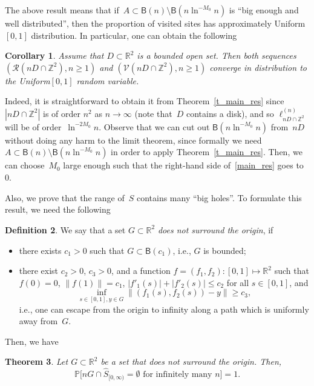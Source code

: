 \documentclass[11pt]{article}
\newtheorem{theo}{Theorem}[section]
\newtheorem{coro}[theo]{Corollary}
\theoremstyle{definition}
\newtheorem{defi}[theo]{Definition}
\numberwithin{equation}{section}
\numberwithin{figure}{section}
\numberwithin{table}{section}
\newcommand{\1}[1]{{\mathbf 1}{\{#1\}}}
\newcommand{\Z}{\mathbb{Z}}
\newcommand{\V}{{\mathcal V}}
\newcommand{\RR}{{\mathcal R}}
\newcommand{\R}{{\mathbb R}}
\newcommand{\s}{{\widehat S}}
\newcommand{\8}{{\infty}}
\newcommand{\IP}{{\mathbb P}}
\newcommand{\B}{{\mathsf B}}
\begin{document}
The above result means that if~$A\subset \B(n)\setminus \B(n\ln^{-M_0}n)$ is ``big enough and well distributed'', then the proportion of visited sites has approximately Uniform$[0,1]$ distribution. In particular, one can obtain the following

\begin{coro}\label{cor_open}
Assume that $D\subset \R^2$ is a bounded open set. Then both sequences $(\RR(nD\cap\Z^2),n\geq 1)$ and $(\V(nD\cap\Z^2),n\geq 1)$ converge in distribution to the Uniform$[0,1]$ random variable.
\end{coro}

Indeed, it is straightforward to obtain it from Theorem~\ref{t_main_res} since $|nD\cap\Z^2|$ is of order $n^2$ as $n\to\infty$ (note that~$D$ contains a disk), and so $\ell^{(n)}_{nD\cap\Z^2}$ will be of order~$\ln^{-2M_0}n$. Observe that we can cut out $\B(n\ln^{-M_0}n)$ from~$nD$ without doing any harm to the limit theorem, since formally we need $A\subset \B(n)\setminus \B(n\ln^{-M_0}n)$ in order to apply Theorem~\ref{t_main_res}. Then, we can choose~$M_0$ large enough such that the right-hand side of~\eqref{main_res} goes to~$0$.

Also, we prove that the range of~$\s$ contains many ``big holes''. To formulate this result, we need the following

\begin{defi}\label{df_surround}
We say that a set $G\subset \R^2$ \emph{does not surround the origin}, if
\begin{itemize}
\item there exists $c_1>0$ such that $G\subset\B(c_1)$, i.e., $G$ is bounded;
\item there exist $c_2>0$, $c_3>0$, and a function $f=(f_1,f_2): [0,1]\mapsto \R^2$ such that $f(0)=0$, $\|f(1)\|= c_1$, $|f'_1(s)|+|f'_2(s)|\leq c_2$ for all $s\in [0,1]$, and
\[
\inf_{s\in[0,1], y\in G} \|(f_1(s),f_2(s))-y\|\geq c_3,
\]
i.e., one can escape from the origin to infinity along a path which is uniformly away from~$G$.
\end{itemize}
\end{defi}

Then, we have

\begin{theo}\label{t_bigholes}
Let $G\subset \R^2$ be a set that does not surround the origin. Then,
\begin{equation}\label{eq_bigholes}
\IP\big[nG\cap \s_{[0,\infty)} = \emptyset
\text{ for infinitely many }n\big] = 1.
\end{equation}
\end{theo}
\end{document}
